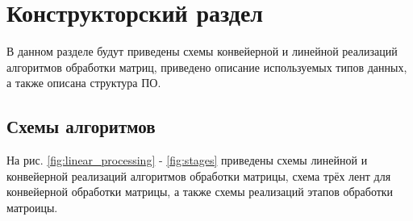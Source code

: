 \chapter{Конструкторский раздел}
\label{cha:design}

В данном разделе будут приведены схемы конвейерной и линейной реализаций алгоритмов обработки матриц, приведено описание используемых типов данных, а также описана структура ПО.

\section{Схемы алгоритмов}

На рис. \ref{fig:linear_processing} - \ref{fig:stages} приведены схемы линейной и конвейерной реализаций алгоритмов обработки матрицы, схема трёх лент для конвейерной обработки матрицы, а также схемы реализаций этапов обработки матроицы.


